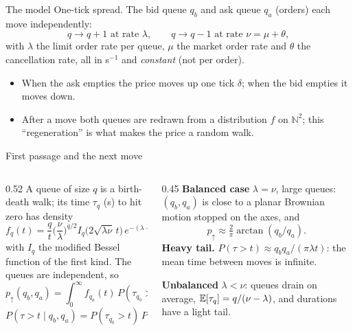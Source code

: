 \documentclass[aspectratio=169,10pt]{beamer}
\begin{document}
\begin{frame}{The model}
  \small
  One-tick spread. The bid queue $q_b$ and ask queue $q_a$ (orders) each move independently:
  \[ q \to q + 1 \text{ at rate } \lambda, \qquad q \to q - 1 \text{ at rate } \nu = \mu + \theta, \]
  with $\lambda$ the limit order rate per queue, $\mu$ the market order rate and $\theta$ the cancellation rate, all in s$^{-1}$ and \emph{constant} (not per order).
  \begin{itemize}
    \item When the ask empties the price moves up one tick $\delta$; when the bid empties it moves down.
    \item After a move both queues are redrawn from a distribution $f$ on $\mathbb{N}^2$; this ``regeneration'' is what makes the price a random walk.
  \end{itemize}
  \vspace{0.3em}
  \centering
\end{frame}

\begin{frame}{First passage and the next move}
  \small
  \begin{columns}[T]
    \begin{column}{0.52\textwidth}
      A queue of size $q$ is a birth-death walk; its time $\tau_q$ (s) to hit zero has density
      \[ f_q(t) = \frac{q}{t}\Big(\frac{\nu}{\lambda}\Big)^{q/2} I_q\big(2\sqrt{\lambda\nu}\,t\big)\,e^{-(\lambda+\nu)t}, \]
      with $I_q$ the modified Bessel function of the first kind. The queues are independent, so
      \[ p_\uparrow(q_b,q_a) = \int_0^\infty f_{q_a}(t)\,P(\tau_{q_b} > t)\,\dd t, \]
      \[ P(\tau > t \mid q_b, q_a) = P(\tau_{q_b} > t)\,P(\tau_{q_a} > t). \]
    \end{column}
    \begin{column}{0.45\textwidth}
      \textbf{Balanced case} $\lambda = \nu$, large queues: $(q_b, q_a)$ is close to a planar Brownian motion stopped on the axes, and
      \[ p_\uparrow \approx \tfrac{2}{\pi}\arctan(q_b/q_a). \]
      \textbf{Heavy tail.} $P(\tau > t) \approx q_b q_a/(\pi\lambda t)$: the mean time between moves is infinite.

      \vspace{0.3em}
      \textbf{Unbalanced} $\lambda < \nu$: queues drain on average, $\mathbb{E}[\tau_q] = q/(\nu - \lambda)$, and durations have a light tail.
    \end{column}
  \end{columns}
\end{frame}
\end{document}
